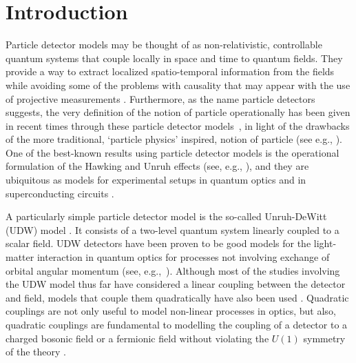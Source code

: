 \documentclass[11pt,prd,onecolumn,superscriptaddress,nofootinbib,floatfix,amsmath,amssymb]{revtex4-2}
\begin{document}
\maketitle



\section{Introduction}
    


    Particle detector models may be thought of as non-relativistic, controllable quantum systems that couple locally in space and time to quantum fields.  They provide a way to extract localized spatio-temporal information from the fields while avoiding some of the problems with causality that may appear with the use of projective measurements \cite{sorkin1956,Dowker2011UselessQ,Benincasa2014projective}. Furthermore, as the name particle detectors suggests, the very definition of the notion of particle operationally has been given in recent times through these particle detector models~\cite{Wald1984accel,Earman2011}, in light of the drawbacks of the more traditional, `particle physics' inspired, notion of particle (see e.g., \cite{Lamb1995}). One of the best-known results using particle detector models is the operational formulation of the Hawking and Unruh effects (see, e.g., \cite{Unruh1979evaporation,Candelas1977irreversible,Crispino2008review}), and they are ubiquitous as models for experimental setups in quantum optics \cite{Scully1997book,boyd2008nonlinear} and in superconducting circuits \cite{Wallraff2004superconducting}. 
    
    A particularly simple particle detector model is the so-called Unruh-DeWitt (UDW) model \cite{Unruh1979evaporation,DeWitt1979}. It consists of a two-level quantum system linearly coupled to a scalar field. UDW detectors have been proven to be good models for the light-matter interaction in quantum optics for processes not involving  exchange of orbital angular momentum (see, e.g.,~\cite{Pablo2018rqo,Pozas2016}). Although most of the studies involving the UDW model thus far have considered a linear coupling between the detector and field, models that couple them quadratically have also been used \cite{Takagi1985detector,Takagi1986noise,Iyer1980dirac,Hummer2016,Jorma2016fermionic,Allison2017a,Allison:2018multi}. Quadratic couplings are not only useful to model non-linear processes in optics, but also, quadratic couplings are fundamental to modelling the coupling of a detector to a charged bosonic field or a fermionic field without violating the $U(1)$ symmetry of the theory \cite{Hummer2016}.
\end{document}
